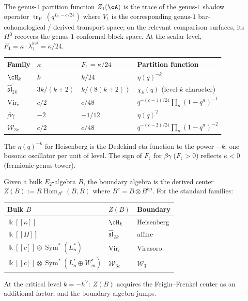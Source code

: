 \begin{computation}
\label{comp:genus1-partition-functions}
The genus-$1$ partition function $Z_1(\cA)$
is the trace of the genus-$1$ shadow operator
$\operatorname{tr}_{V_1}(q^{L_0-c/24})$ where
$V_1$ is the corresponding genus-$1$ bar-cohomological /
derived transport space; on the relevant comparison surfaces,
its $H^0$ recovers the genus-$1$ conformal-block space.
At the scalar level, $F_1=\kappa\cdot\lambda_1^{\mathrm{FP}}=\kappa/24$.
\begin{center}
\renewcommand{\arraystretch}{1.2}
\begin{tabular}{llll}
\textbf{Family} & $\kappa$ & $F_1=\kappa/24$
 & \textbf{Partition function} \\
\hline
$\cH_k$ & $k$ & $k/24$
 & $\eta(q)^{-k}$ \\
$\widehat{\mathfrak{sl}}_2{}_k$
 & $3k/(k{+}2)$ & $k/(8(k{+}2))$
 & $\chi_k(q)$ (level-$k$ character) \\
$\mathrm{Vir}_c$ & $c/2$ & $c/48$
 & $q^{-(c-1)/24}\prod_n(1-q^n)^{-1}$ \\
$\beta\gamma$ & $-2$ & $-1/12$
 & $\eta(q)^2$ \\
$\mathcal W_3{}_c$ & $c/2$ & $c/48$
 & $q^{-(c-2)/24}\prod_n(1-q^n)^{-2}$
\end{tabular}
\end{center}
The $\eta(q)^{-k}$ for Heisenberg is the Dedekind eta
function to the power $-k$: one bosonic oscillator per unit
of level. The sign of $F_1$ for $\beta\gamma$ ($F_1>0$)
reflects $\kappa<0$ (fermionic genus tower).
\end{computation}

\begin{construction}
\label{constr:boundary-from-bulk}
Given a bulk $E_2$-algebra $B$, the boundary algebra is the
derived center
$Z(B):=R\!\operatorname{Hom}_{B^e}(B,B)$
where $B^e=B\otimes B^{\mathrm{op}}$. For the standard families:
\begin{center}
\renewcommand{\arraystretch}{1.15}
\begin{tabular}{lll}
\textbf{Bulk $B$} & \textbf{$Z(B)$} & \textbf{Boundary} \\
\hline
$\Bbbk[[\kappa]]$ & $\cH_k$ & Heisenberg \\
$\Bbbk[[\Omega]]$ & $\widehat{\mathfrak{sl}}_2{}_k$ & affine \\
$\Bbbk[[c]]\otimes\operatorname{Sym}^*(L_n^*)$
 & $\mathrm{Vir}_c$ & Virasoro \\
$\Bbbk[[c]]\otimes\operatorname{Sym}^*(L_n^*\oplus W_m^*)$
 & $\mathcal W_3{}_c$ & $\mathcal W_3$
\end{tabular}
\end{center}
At the critical level $k=-h^\vee$: $Z(B)$ acquires the
Feigin--Frenkel center as an additional factor, and the
boundary algebra jumps.
\end{construction}

